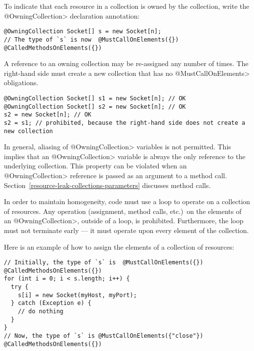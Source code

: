 
To indicate that each resource in a collection is owned by the collection, write the \<@OwningCollection> declaration annotation:

\begin{Verbatim}
@OwningCollection Socket[] s = new Socket[n];
// The type of `s` is now  @MustCallOnElements({}) @CalledMethodsOnElements({})
\end{Verbatim}

A reference to an owning collection may be re-assigned any number of times.
The right-hand side must create a new collection that has no
\<@MustCallOnElements> obligations.

\begin{verbatim}
@OwningCollection Socket[] s1 = new Socket[n]; // OK
@OwningCollection Socket[] s2 = new Socket[n]; // OK
s2 = new Socket[n]; // OK
s2 = s1; // prohibited, because the right-hand side does not create a new collection
\end{verbatim}

In general, aliasing of \<@OwningCollection> variables is not permitted.
This implies that an \<@OwningCollection> variable is always the only
reference to the underlying collection.  This property can be violated when
an \<@OwningCollection> reference is passed as an argument to a method
call.  Section~\ref{resource-leak-collections-parameters} discusses method
calls.



In order to maintain homogeneity, code must use a loop to operate on a
collection of resources.  Any operation (assignment, method calls, etc.)\
on the elements of an \<@OwningCollection>, outside of a loop, is
prohibited.  Furthermore, the loop must not terminate early --- it must
operate upon every element of the collection.

Here is an example of how to assign the elements of a collection of resources:

\begin{Verbatim}
// Initially, the type of `s` is  @MustCallOnElements({}) @CalledMethodsOnElements({})
for (int i = 0; i < s.length; i++) {
  try {
    s[i] = new Socket(myHost, myPort);
  } catch (Exception e) {
    // do nothing
  }
}
// Now, the type of `s` is @MustCallOnElements({"close"}) @CalledMethodsOnElements({})
\end{Verbatim}

